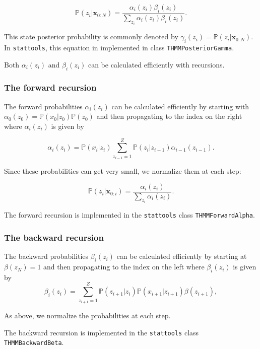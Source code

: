 \documentclass[a4paper,11pt]{article}
\def\x{\boldsymbol{x}}
\def\p{\mathbb{P}}
\def\stattools{\texttt{stattools}}
\newcommand{\class}[1]{\texttt{#1}}
\begin{document}
\begin{equation}\label{eq:f_b_gamma}
\p(z_i | \x_{0:N}) = \frac{\alpha_i(z_i)\beta_i(z_i)}{\sum_{z_i}\alpha_i(z_i)\beta_i(z_i)}.
\end{equation}

This state posterior probability is commonly denoted by $\gamma_i(z_i) = \p(z_i | \x_{0:N})$. In \stattools{}, this equation in implemented in class \class{THMMPosteriorGamma}.

Both $\alpha_i(z_i)$ and $\beta_i(z_i)$ can be calculated efficiently with recursions.

\subsubsection{The forward recursion}

The forward probabilities $\alpha_i(z_i)$ can be calculated efficiently by starting with $\alpha_0(z_0) = \p(x_0 | z_0) \p(z_0)$ and then propagating to the index on the right where $\alpha_i(z_i)$ is given by

\begin{equation*}
\alpha_i(z_i) = \p(x_i | z_i) \sum_{z_{i-1}=1}^Z \p(z_i | z_{i-1}) \alpha_{i-1}(z_{i-1}).
\end{equation*}

Since these probabilities can get very small, we normalize them at each step:

\begin{equation*}
\p(z_i| \x_{0:i})= \displaystyle \frac{\alpha_i(z_i)}{\sum_{z_i}\alpha_i(z_i)}.
\end{equation*}

The forward recursion is implemented in the \stattools{} class \class{THMMForwardAlpha}.

\subsubsection{The backward recursion}

The backward probabilities $\beta_i(z_i)$ can be calculated efficiently by starting at $\beta(z_N)=1$ and then propagating to the index on the left where $\beta_i(z_i)$ is given by
\begin{equation*}
\beta_i(z_i) = \sum_{z_{i+1}=1}^Z \p(z_{i+1} | z_i) \p(x_{i+1} |z_{i+1}) \beta(z_{i+1}),
\end{equation*}

As above, we normalize the probabilities at each step.

The backward recursion is implemented in the \stattools{} class \class{THMMBackwardBeta}.
\end{document}
